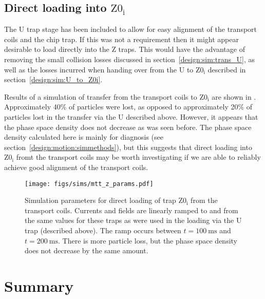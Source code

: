 \subsection{Direct loading into $\mathrm{Z0_i}$}

The U trap stage has been included to allow for easy alignment of the transport
coils and the chip trap. If this was not a requirement then it might appear
desirable to load directly into the Z traps. This would have the advantage of
removing the small collision losses discussed in
section~\ref{design:sim:trans_U}, as well as the losses incurred when handing
over from the U to $\mathrm{Z0_i}$ described in
section~\ref{design:sim:U_to_Z0i}.

Results of a simulation of transfer from the transport coils to $\mathrm{Z0_i}$
are shown in .  Approximately 40\% of
particles were lost, as opposed to approximately 20\% of particles lost in the
transfer via the U described above.  However, it appears that the phase space
density does not decrease as was seen before. The phase space density
calculated here is mainly for diagnosis (see section~\ref{design:motion:simmethods}),
but this suggests that direct loading into $\mathrm{Z0_i}$ fromt the transport
coils may be worth investigating if we are able to reliably achieve good
alignment of the transport coils. 

\begin{figure}[tbh]
\centering
  \texttt{[image: figs/sims/mtt\_z\_params.pdf]}
  \caption{
    Simulation parameters for direct loading of trap $\mathrm{Z0_i}$ from the
    transport coils. Currents and fields are linearly ramped to and from the
    same values for these traps as were used in the loading via the U trap
    (described above). The ramp occurs between $t=\SI{100}{\milli\second}$ and
    $t=\SI{200}{\milli\second}$. There is more particle loss, but the phase
    space density does not decrease by the same amount.
  }
  \label{design:fig:directzramp}
\end{figure}



\section{Summary}

